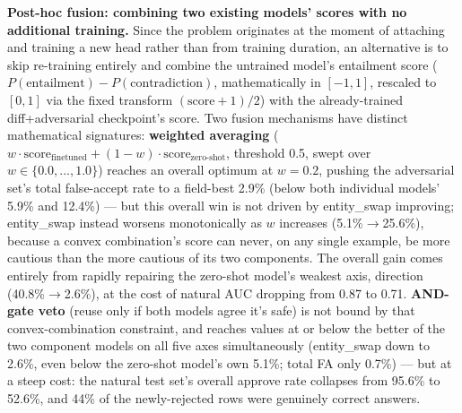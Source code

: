 \documentclass[11pt]{article}
\begin{document}
\textbf{Post-hoc fusion: combining two existing models' scores with no additional training.} Since the problem originates at the moment of attaching and training a new head rather than from training duration, an alternative is to skip re-training entirely and combine the untrained model's entailment score ($P(\text{entailment}) - P(\text{contradiction})$, mathematically in $[-1, 1]$, rescaled to $[0, 1]$ via the fixed transform $(\text{score} + 1) / 2$) with the already-trained diff+adversarial checkpoint's score. Two fusion mechanisms have distinct mathematical signatures: \textbf{weighted averaging} ($w \cdot \text{score}_\text{finetuned} + (1 - w) \cdot \text{score}_\text{zero-shot}$, threshold 0.5, swept over $w \in \{0.0, ..., 1.0\}$) reaches an overall optimum at $w = 0.2$, pushing the adversarial set's total false-accept rate to a field-best 2.9\% (below both individual models' 5.9\% and 12.4\%) --- but this overall win is not driven by entity\_swap improving; entity\_swap instead worsens monotonically as $w$ increases (5.1\%$\to$25.6\%), because a convex combination's score can never, on any single example, be more cautious than the more cautious of its two components. The overall gain comes entirely from rapidly repairing the zero-shot model's weakest axis, direction (40.8\%$\to$2.6\%), at the cost of natural AUC dropping from 0.87 to 0.71. \textbf{AND-gate veto} (reuse only if both models agree it's safe) is not bound by that convex-combination constraint, and reaches values at or below the better of the two component models on all five axes simultaneously (entity\_swap down to 2.6\%, even below the zero-shot model's own 5.1\%; total FA only 0.7\%) --- but at a steep cost: the natural test set's overall approve rate collapses from 95.6\% to 52.6\%, and 44\% of the newly-rejected rows were genuinely correct answers.
\end{document}
